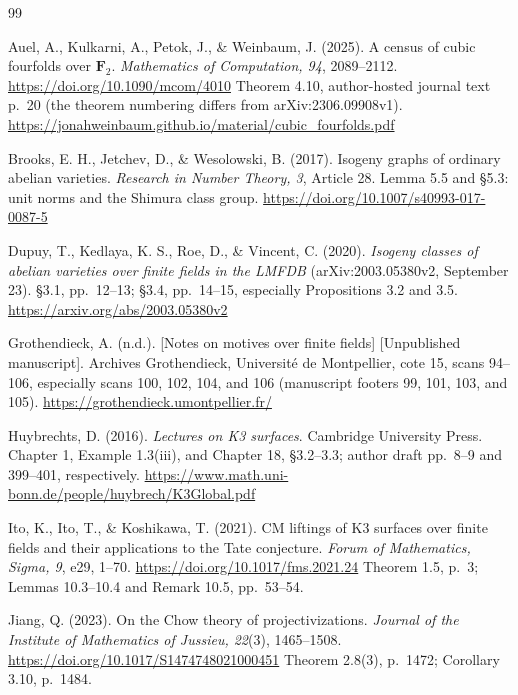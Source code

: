 \documentclass[11pt,a4paper]{article}
\newcommand{\F}{\mathbf F}
\theoremstyle{definition}
\theoremstyle{remark}
\begin{document}
\clearpage
\begin{thebibliography}{99}

Auel, A., Kulkarni, A., Petok, J., \& Weinbaum, J. (2025).
A census of cubic fourfolds over $\F_2$.
\emph{Mathematics of Computation, 94}, 2089--2112.
\url{https://doi.org/10.1090/mcom/4010}
Theorem 4.10, author-hosted journal text p.~20 (the theorem numbering
differs from arXiv:2306.09908v1).
\url{https://jonahweinbaum.github.io/material/cubic_fourfolds.pdf}

Brooks, E. H., Jetchev, D., \& Wesolowski, B. (2017).
Isogeny graphs of ordinary abelian varieties.
\emph{Research in Number Theory, 3}, Article 28.
Lemma 5.5 and \S5.3: unit norms and the Shimura class group.
\url{https://doi.org/10.1007/s40993-017-0087-5}

Dupuy, T., Kedlaya, K. S., Roe, D., \& Vincent, C. (2020).
\emph{Isogeny classes of abelian varieties over finite fields in the
LMFDB} (arXiv:2003.05380v2, September 23).
\S3.1, pp.~12--13; \S3.4, pp.~14--15, especially
Propositions 3.2 and 3.5.
\url{https://arxiv.org/abs/2003.05380v2}

Grothendieck, A. (n.d.).
[Notes on motives over finite fields] [Unpublished manuscript].
Archives Grothendieck, Universit\'e de Montpellier, cote 15,
scans 94--106, especially scans 100, 102, 104, and 106
(manuscript footers 99, 101, 103, and 105).
\url{https://grothendieck.umontpellier.fr/}

Huybrechts, D. (2016).
\emph{Lectures on K3 surfaces}. Cambridge University Press.
Chapter 1, Example 1.3(iii), and Chapter 18, \S3.2--3.3;
author draft pp.~8--9 and 399--401, respectively.
\url{https://www.math.uni-bonn.de/people/huybrech/K3Global.pdf}

Ito, K., Ito, T., \& Koshikawa, T. (2021).
CM liftings of K3 surfaces over finite fields and their applications
to the Tate conjecture.
\emph{Forum of Mathematics, Sigma, 9}, e29, 1--70.
\url{https://doi.org/10.1017/fms.2021.24}
Theorem 1.5, p.~3; Lemmas 10.3--10.4 and Remark 10.5, pp.~53--54.

Jiang, Q. (2023).
On the Chow theory of projectivizations.
\emph{Journal of the Institute of Mathematics of Jussieu, 22}(3),
1465--1508.
\url{https://doi.org/10.1017/S1474748021000451}
Theorem 2.8(3), p.~1472; Corollary 3.10, p.~1484.


\end{thebibliography}
\end{document}
